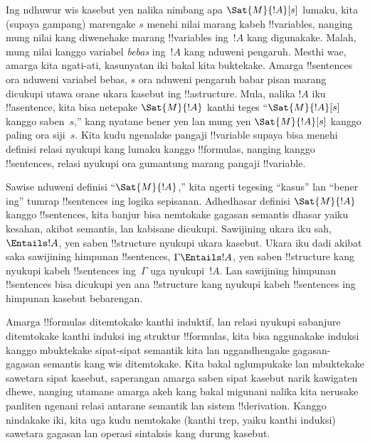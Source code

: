 \documentclass[../../../include/open-logic-section]{subfiles}
\begin{document}


Ing ndhuwur wis kasebut yen nalika nimbang apa $\Sat{M}{!A}[s]$
lumaku, kita (supaya gampang) marengake $s$ menehi nilai marang kabeh
!!{variable}s, nanging mung nilai kang diwenehake marang !!{variable}s
ing~$!A$ kang digunakake. Malah, mung nilai kanggo variabel
\emph{bebas} ing~$!A$ kang nduweni pengaruh. Mesthi wae, amarga kita
ngati-ati, kasunyatan iki bakal kita buktekake. Amarga !!{sentence}s
ora nduweni variabel bebas, $s$ ora nduweni pengaruh babar pisan
marang dicukupi utawa orane ukara kasebut ing !!a{structure}. Mula,
nalika $!A$ iku !!a{sentence}, kita bisa netepake $\Sat{M}{!A}$ kanthi
teges ``$\Sat{M}{!A}[s]$ kanggo saben~$s$,'' kang nyatane bener yen lan
mung yen $\Sat{M}{!A}[s]$ kanggo paling ora siji~$s$. Kita kudu
ngenalake pangaji !!{variable} supaya bisa menehi definisi relasi
nyukupi kang lumaku kanggo !!{formula}s, nanging kanggo !!{sentence}s,
relasi nyukupi ora gumantung marang pangaji !!{variable}.

Sawise nduweni definisi ``$\Sat{M}{!A}$,'' kita ngerti tegesing
``kasus'' lan ``bener ing'' tumrap !!{sentence}s ing logika sepisanan.
Adhedhasar definisi $\Sat{M}{!A}$ kanggo !!{sentence}s, kita banjur bisa
nemtokake gagasan semantis dhasar yaiku kesahan, akibat semantis, lan
kabisane dicukupi. Sawijining ukara iku sah, $\Entails !A$, yen saben
!!{structure} nyukupi ukara kasebut. Ukara iku dadi akibat saka
sawijining himpunan !!{sentence}s, $\Gamma \Entails !A$, yen saben
!!{structure} kang nyukupi kabeh !!{sentence}s ing~$\Gamma$ uga
nyukupi~$!A$. Lan sawijining himpunan !!{sentence}s bisa dicukupi yen
ana !!{structure} kang nyukupi kabeh !!{sentence}s ing himpunan
kasebut bebarengan.

Amarga !!{formula}s ditemtokake kanthi induktif, lan relasi nyukupi
sabanjure ditemtokake kanthi induksi ing struktur !!{formula}s, kita
bisa nggunakake induksi kanggo mbuktekake sipat-sipat semantik kita
lan nggandhengake gagasan-gagasan semantis kang wis ditemtokake. Kita
bakal nglumpukake lan mbuktekake sawetara sipat kasebut, saperangan
amarga saben sipat kasebut narik kawigaten dhewe, nanging utamane
amarga akeh kang bakal migunani nalika kita nerusake panliten ngenani
relasi antarane semantik lan sistem !!{derivation}. Kanggo nindakake
iki, kita uga kudu nemtokake (kanthi trep, yaiku kanthi induksi)
sawetara gagasan lan operasi sintaksis kang durung kasebut.
\end{document}
